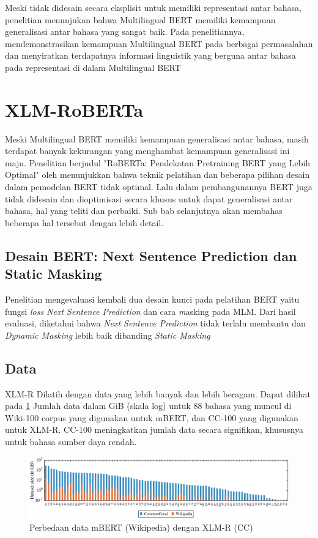     Meski tidak didesain secara eksplisit untuk memiliki representasi antar bahasa, penelitian \parencite{Pires_Schlinger_Garrette_2019} menunjukan bahwa Multilingual BERT memiliki kemampuan generalisasi antar bahasa yang sangat baik. Pada penelitiannya, \parencite{Pires_Schlinger_Garrette_2019} mendemonstrasikan kemampuan Multilingual BERT pada berbagai permasalahan dan menyiratkan terdapatnya informasi linguistik yang berguna antar bahasa  pada representasi di dalam Multilingual BERT
  
\section{XLM-RoBERTa}
    Meski Multilingual BERT memiliki kemampuan generalisasi antar bahasa, masih terdapat banyak kekurangan yang menghambat kemampuan generalisasi ini maju.
    Penelitian berjudul "RoBERTa: Pendekatan Pretraining BERT yang Lebih Optimal" oleh \parencite{Liu_Ott_Goyal_Du_Joshi_Chen_Levy_Lewis_Zettlemoyer_Stoyanov_2019} menunjukkan bahwa teknik pelatihan dan beberapa pilihan desain dalam pemodelan BERT tidak optimal. Lalu dalam pembangunannya BERT juga tidak didesain dan dioptimisasi secara khusus untuk dapat generalisasi antar bahasa, hal yang \parencite{Conneau_XLMR} teliti dan perbaiki. Sub bab selanjutnya akan membahas beberapa hal tersebut dengan lebih detail.

    \subsection{Desain BERT: Next Sentence Prediction dan Static Masking}
    Penelitian \parencite{Liu_Ott_Goyal_Du_Joshi_Chen_Levy_Lewis_Zettlemoyer_Stoyanov_2019} mengevaluasi kembali dua desain kunci pada pelatihan BERT yaitu fungsi \textit{loss Next Sentence Prediction} dan cara \textit masking pada MLM. Dari hasil evaluasi, diketahui bahwa \textit{Next Sentence Prediction} tidak terlalu membantu dan \textit{Dynamic Masking} lebih baik dibanding \textit{Static Masking}
 
    \subsection{Data}
    XLM-R Dilatih dengan data yang lebih banyak dan lebih beragam. Dapat dilihat pada \ref{fig:data_xlm_r} Jumlah data dalam GiB (skala log) untuk 88 bahasa yang muncul di Wiki-100 corpus yang digunakan untuk mBERT, dan CC-100 yang digunakan untuk XLM-R. CC-100 meningkatkan jumlah data secara signifikan, khususnya untuk bahasa sumber daya rendah.
    \begin{figure}[ht]
        \centering
        \includegraphics[width=1\textwidth]{resources/data_xlm_r.png}
        \caption{Perbedaan data mBERT (Wikipedia) dengan XLM-R (CC) \parencite{Conneau_XLMR}}
        \label{fig:data_xlm_r}
    \end{figure}

